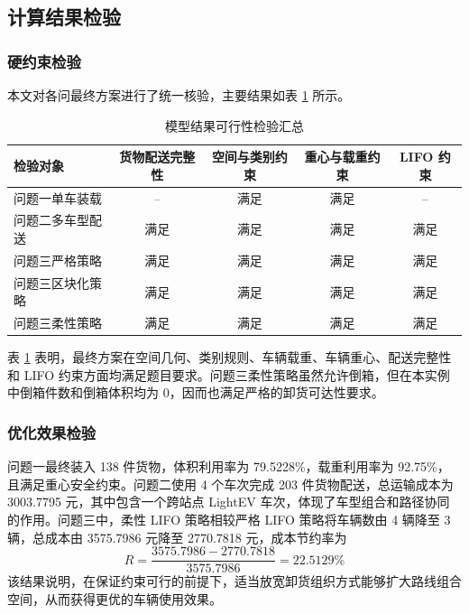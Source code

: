 ﻿\documentclass[UTF8,a4paper,12pt]{ctexart}
\begin{document}
	\subsection{计算结果检验}
	
	\subsubsection{硬约束检验}
	
	本文对各问最终方案进行了统一核验，主要结果如表 \ref{tab:model_check_summary} 所示。
	
	\begin{table}[H]
		\centering
		\caption{模型结果可行性检验汇总}
		\label{tab:model_check_summary}
		\begin{tabular}{l c c c c}
			\toprule
			检验对象 & 货物配送完整性 & 空间与类别约束 & 重心与载重约束 & LIFO 约束 \\
			\midrule
			问题一单车装载 & -- & 满足 & 满足 & -- \\
			问题二多车型配送 & 满足 & 满足 & 满足 & 满足 \\
			问题三严格策略 & 满足 & 满足 & 满足 & 满足 \\
			问题三区块化策略 & 满足 & 满足 & 满足 & 满足 \\
			问题三柔性策略 & 满足 & 满足 & 满足 & 满足 \\
			\bottomrule
		\end{tabular}
	\end{table}
	
	表 \ref{tab:model_check_summary} 表明，最终方案在空间几何、类别规则、车辆载重、车辆重心、配送完整性和 LIFO 约束方面均满足题目要求。问题三柔性策略虽然允许倒箱，但在本实例中倒箱件数和倒箱体积均为 0，因而也满足严格的卸货可达性要求。
	
	\subsubsection{优化效果检验}
	
	问题一最终装入 138 件货物，体积利用率为 79.5228\%，载重利用率为 92.75\%，且满足重心安全约束。问题二使用 4 个车次完成 203 件货物配送，总运输成本为 3003.7795 元，其中包含一个跨站点 LightEV 车次，体现了车型组合和路径协同的作用。问题三中，柔性 LIFO 策略相较严格 LIFO 策略将车辆数由 4 辆降至 3 辆，总成本由 3575.7986 元降至 2770.7818 元，成本节约率为
	\begin{equation}
		R=\frac{3575.7986-2770.7818}{3575.7986}=22.5129\%
	\end{equation}
	该结果说明，在保证约束可行的前提下，适当放宽卸货组织方式能够扩大路线组合空间，从而获得更优的车辆使用效果。
	
\end{document}
